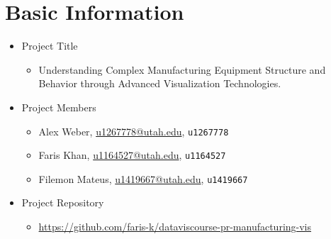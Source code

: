 \section{Basic Information}
\begin{itemize}
  \item
    Project Title
    \begin{itemize}
      \item Understanding Complex Manufacturing Equipment Structure and Behavior through Advanced Visualization Technologies.
    \end{itemize}
  \item
    Project Members
    \begin{itemize}
      \item Alex Weber, \href{mailto:u1267778@utah.edu}{\url{u1267778@utah.edu}}, \texttt{u1267778}
      \item Faris Khan, \href{mailto:u1164527@utah.edu}{\url{u1164527@utah.edu}}, \texttt{u1164527}
      \item Filemon Mateus, \href{mailto:u1419667@utah.edu}{\url{u1419667@utah.edu}}, \texttt{u1419667}
    \end{itemize}

  \item
    Project Repository
    \begin{itemize}
      \item \href{https://github.com/faris-k/dataviscourse-pr-manufacturing-vis}{\url{https://github.com/faris-k/dataviscourse-pr-manufacturing-vis}}
    \end{itemize}
\end{itemize}

